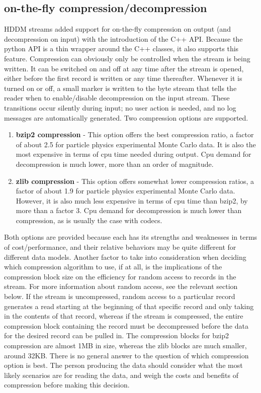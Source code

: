 \documentclass{revtex4}
\begin{document}
\subsection{on-{}the-{}fly compression/decompression}

HDDM streams added support for on-{}the-{}fly compression on output (and 
decompression on input) with the introduction of the C++ API. Because the 
python API is a thin wrapper around the C++ classes, it also supports this
feature. Compression can obviously only be controlled when the stream is
being written. It can be switched on and off at any time after the stream
is opened, either before the first record is written or any time thereafter.
Whenever it is turned on or off, a small marker is written to the byte
stream that tells the reader when to enable/disable decompression on the
input stream. These transitions occur silently during input; no user
action is needed, and no log messages are automatically generated. Two
compression options are supported.

\begin{enumerate}
\item{\bf bzip2 compression} -{}
This option offers the best compression ratio, a factor of about 2.5 for
particle physics experimental Monte Carlo data. It is also the most 
expensive in terms of cpu time needed during output. Cpu demand for
decompression is much lower, more than an order of magnitude.
\item{\bf zlib compression} -{}
This option offers somewhat lower compression ratios, a factor of about 
1.9 for particle physics experimental Monte Carlo data. However, it is
also much less expensive in terms of cpu time than bzip2, by more than
a factor 3. Cpu demand for decompression is much lower than compression,
as is usually the case with codecs.
\end{enumerate}

Both options are provided because each has its strengths and weaknesses
in terms of cost/performance, and their relative behaviors may be quite
different for different data models. Another factor to take into 
consideration when deciding which compression algorithm to use, if at all,
is the implications of the compression block size on the efficiency for
random access to records in the stream. For more information about random
access, see the relevant section below. If the stream is uncompressed,
random access to a particular record generates a read starting at the
beginning of that specific record and only taking in the contents of 
that record, whereas if the stream is compressed, the entire compression
block containing the record must be decompressed before the data for the
desired record can be pulled in. The compression blocks for bzip2 
compression are almost 1MB in size, whereas the zlib blocks are much
smaller, around 32KB. There is no general answer to the question of which
compression option is best. The person producing the data should consider
what the most likely scenarios are for reading the data, and weigh the
costs and benefits of compression before making this decision.
\end{document}
